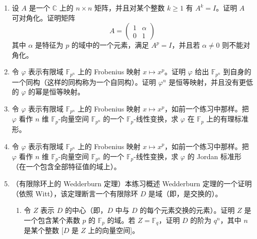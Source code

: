 \begin{enumerate}[label=\arabic*.]
\begin{enumerate}[label=(\alph*)]
	 	\item 证明对任意不能被 $\ell$ 整除的整数 $a$，有
	 	\[
	 	\mathbb F_p(\zeta)=\mathbb F_p(\zeta^a).
	 	\]
	 	[一个包含关系是显然的。对于另一个，注意 $\zeta=(\zeta^a)^b$，其中 $b$ 是 $a$ 模 $\ell$ 的乘法逆元。] 利用 (b) 推出，在 $\mathbb F_p[x]$ 中，$\Phi_\ell(x)$ 是 $(\ell-1)/f$ 个互异的次数为 $f$ 的不可约多项式的乘积。
	 	
	 	\item 特别地，证明在 $\mathbb F_p[x]$ 中看，
	 	\[
	 	\Phi_7(x)=x^6+x^5+\cdots+x+1
	 	\]
	 	当 $p=7$ 时为 $(x-1)^6$；当 $p\equiv1\pmod7$ 时是互异线性因子的乘积；当 $p\equiv6\pmod7$ 时是 $3$ 个不可约二次多项式的乘积；当 $p\equiv2,4\pmod7$ 时是 $2$ 个不可约三次多项式的乘积；当 $p\equiv3,5\pmod7$ 时不可约。
	 \end{enumerate}
	 
	 \item 设 $A$ 是一个 $\mathbb C$ 上的 $n\times n$ 矩阵，并且对某个整数 $k\geq1$ 有 $A^k=I$。证明 $A$ 可对角化。证明矩阵
	 \[
	 A=\begin{pmatrix}1&\alpha\\0&1\end{pmatrix}
	 \]
	 其中 $\alpha$ 是特征为 $p$ 的域中的一个元素，满足 $A^p=I$，并且若 $\alpha\neq0$ 则不能对角化。
	 
	 \item 令 $\varphi$ 表示有限域 $\mathbb F_{p^n}$ 上的 Frobenius 映射 $x\mapsto x^p$。证明 $\varphi$ 给出 $\mathbb F_{p^n}$ 到自身的一个同构（这样的同构称为一个自同构）。证明 $\varphi^n$ 是恒等映射，并且没有更低的 $\varphi$ 的幂是恒等映射。
	 
	 \item 令 $\varphi$ 表示有限域 $\mathbb F_{p^n}$ 上的 Frobenius 映射 $x\mapsto x^p$，如前一个练习中那样。把 $\varphi$ 看作 $n$ 维 $\mathbb F_p$-向量空间 $\mathbb F_{p^n}$ 的一个 $\mathbb F_p$-线性变换，求 $\varphi$ 在 $\mathbb F_p$ 上的有理标准形。
	 
	 \item 令 $\varphi$ 表示有限域 $\mathbb F_{p^n}$ 上的 Frobenius 映射 $x\mapsto x^p$，如前一个练习中那样。把 $\varphi$ 看作 $n$ 维 $\mathbb F_p$-向量空间 $\mathbb F_{p^n}$ 的一个 $\mathbb F_p$-线性变换，求 $\varphi$ 的 Jordan 标准形（在一个包含全部特征值的域上）。
	 
	 \item （有限除环上的 Wedderburn 定理）本练习概述 Wedderburn 定理的一个证明（依照 Witt），该定理断言一个有限除环 $D$ 是域（即，是交换的）。
	 \begin{enumerate}[label=(\alph*)]
	 	\item 令 $Z$ 表示 $D$ 的中心（即，$D$ 中与 $D$ 的每个元素交换的元素）。证明 $Z$ 是一个包含某个素数 $p$ 的 $\mathbb F_p$ 的域。若 $Z=\mathbb F_q$，证明 $D$ 的阶为 $q^n$，其中 $n$ 是某个整数 [$D$ 是 $Z$ 上的向量空间]。
	 	

\end{enumerate}
\end{enumerate}

